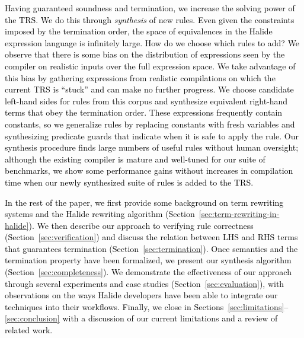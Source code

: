 \documentclass[acmsmall]{acmart}\settopmatter{}
\newcommand{\modified}[1]{\textcolor{black}{{#1}}}
\newcommand{\modifiedagain}[1]{\textcolor{black}{{#1}}}
\begin{document}
\modified{Having guaranteed soundness and termination, we increase 
the solving power of the TRS. We do this through \emph{synthesis} of new rules. Even
given the constraints imposed by the termination order, the space of equivalences 
in the Halide expression language is infinitely large. How do we choose which  
rules to add? We observe that there is some bias on the distribution of expressions 
seen by the compiler on realistic inputs over the full expression space. We take advantage 
of this bias by gathering expressions from realistic compilations on which the current 
TRS is ``stuck'' and can make no further progress. We choose candidate left-hand sides 
for rules from this corpus and synthesize equivalent right-hand terms that obey the 
termination order. \modifiedagain{These expressions frequently contain constants, so we
generalize rules by replacing constants
with fresh variables and synthesizing predicate guards that indicate when it is safe to apply 
the rule.} Our synthesis procedure finds large numbers of useful rules without
human oversight; although the existing compiler is mature 
and well-tuned for our suite of benchmarks, we show some performance 
gains without increases in compilation time when our newly synthesized suite 
of rules is added to the TRS. }


\modified{In the rest of the paper, we first provide some background on term rewriting systems 
and the Halide rewriting algorithm (Section~\ref{sec:term-rewriting-in-halide}).
We then describe our approach to verifying
rule correctness (Section~\ref{sec:verification}) and discuss the relation between LHS and RHS terms that guarantees 
termination (Section~\ref{sec:termination}). Once semantics and the termination property have been formalized, 
we present our synthesis algorithm (Section~\ref{sec:completeness}). We demonstrate the effectiveness of our approach 
through several experiments and case studies (Section~\ref{sec:evaluation}), with observations on the ways Halide developers 
have been able to integrate our techniques into their workflows. Finally, we close in Sections~\ref{sec:limitations}--\ref{sec:conclusion}
 with a discussion of our current limitations and a review of related work.}
\end{document}
